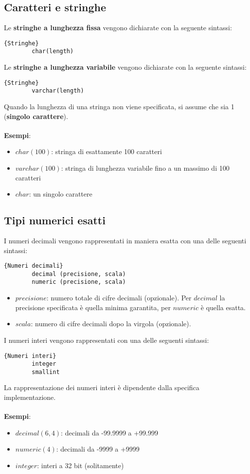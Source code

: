 \subsection{Caratteri e stringhe}
Le \textbf{stringhe a lunghezza fissa} vengono dichiarate con la seguente sintassi:
    \begin{lstlisting}{Stringhe}
        char(length)
    \end{lstlisting}
Le \textbf{stringhe a lunghezza variabile} vengono dichiarate con la seguente sintassi:
    \begin{lstlisting}{Stringhe}
        varchar(length)
    \end{lstlisting}
Quando la lunghezza di una stringa non viene specificata, si assume che sia 1 (\textbf{singolo carattere}).\\\\
\textbf{Esempi}:
    \begin{itemize}
        \item{$char(100)$: stringa di esattamente 100 caratteri}
        \item{$varchar(100)$: stringa di lunghezza variabile fino a un massimo di 100 caratteri}
        \item{$char$: un singolo carattere}
    \end{itemize}
    
\subsection{Tipi numerici esatti}
I numeri decimali vengono rappresentati in maniera esatta con una delle seguenti sintassi:
    \begin{lstlisting}{Numeri decimali}
        decimal (precisione, scala)
        numeric (precisione, scala)
   \end{lstlisting}
    \begin{itemize}
        \item{$precisione$: numero totale di cifre decimali (opzionale). Per $decimal$ la precisione specificata è quella minima garantita, per $numeric$ è quella esatta.}
        \item{$scala$: numero di cifre decimali dopo la virgola (opzionale).}
    \end{itemize}
I numeri interi vengono rappresentati con una delle seguenti sintassi:
    \begin{lstlisting}{Numeri interi}
        integer
        smallint
    \end{lstlisting}
La rappresentazione dei numeri interi è dipendente dalla specifica implementazione.\\\\
\textbf{Esempi}:
    \begin{itemize}
        \item{$decimal(6,4)$: decimali da -99.9999 a +99.999}
        \item{$numeric(4)$: decimali da -9999 a +9999}
        \item{$integer$: interi a 32 bit (solitamente)}
    \end{itemize}

